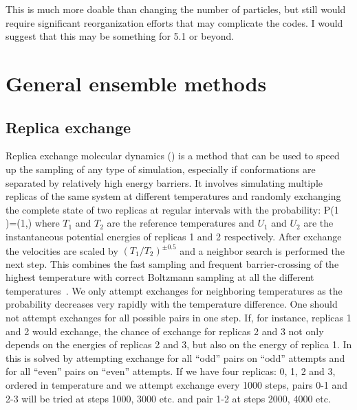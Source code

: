 \documentclass[11pt,a4paper,twoside]{article}
\begin{document}
This is much more doable than changing the number of particles, but
still would require significant reorganization efforts that may
complicate the codes.  I would suggest that this may be something for
5.1 or beyond.

\section{General ensemble methods}

\subsection{Replica exchange}
Replica exchange molecular dynamics ()
is a method that can be used to speed up
the sampling of any type of simulation, especially if
conformations are separated by relatively high energy barriers.
It involves simulating multiple replicas of the same system
at different temperatures and randomly exchanging the complete state
of two replicas at regular intervals with the probability:
\beq
P(1 )=\min\left(1,\exp{} \right)
\eeq
where $T_1$ and $T_2$ are the reference temperatures and $U_1$ and $U_2$
are the instantaneous potential energies of replicas 1 and 2 respectively.
After exchange the velocities are scaled by $(T_1/T_2)^{\pm0.5}$
and a neighbor search is performed the next step.
This combines the fast sampling and frequent barrier-crossing
of the highest temperature with correct Boltzmann sampling at
all the different temperatures~\cite{Hukushima96a,Sugita99}.
We only attempt exchanges for neighboring temperatures as the probability
decreases very rapidly with the temperature difference.
One should not attempt exchanges for all possible pairs in one step.
If, for instance, replicas 1 and 2 would exchange, the chance of
exchange for replicas 2 and 3 not only depends on the energies of
replicas 2 and 3, but also on the energy of replica 1.
In {\gromacs} this is solved by attempting exchange for all ``odd''
pairs on ``odd'' attempts and for all ``even'' pairs on ``even'' attempts.
If we have four replicas: 0, 1, 2 and 3, ordered in temperature
and we attempt exchange every 1000 steps, pairs 0-1 and 2-3
will be tried at steps 1000, 3000 etc. and pair 1-2 at steps 2000, 4000 etc.
\end{document}
